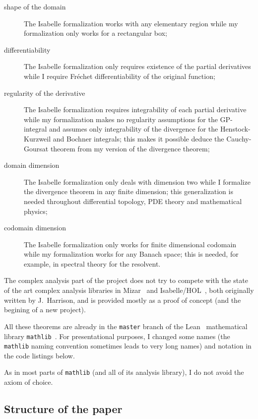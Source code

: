 \documentclass[a4paper, UKenglish,cleveref, autoref, thm-restate]{lipics-v2021}
\begin{document}
\begin{description}
\item[shape of the domain] The Isabelle formalization works with any
  elementary region while my formalization only works for a
  rectangular box;
\item[differentiability] The Isabelle formalization only requires
  existence of the partial derivatives while I require Fréchet
  differentiability of the original function;
\item[regularity of the derivative] The Isabelle formalization
  requires integrability of each partial derivative while my
  formalization makes no regularity assumptions for the GP-integral
  and assumes only integrability of the divergence for the
  Henstock-Kurzweil and Bochner integrals; this makes it possible
  deduce the Cauchy-Goursat theorem from my version of the divergence
  theorem;
\item[domain dimension] The Isabelle formalization only deals with
  dimension two while I formalize the divergence theorem in any finite
  dimension; this generalization is needed throughout differential
  topology, PDE theory and mathematical physics;
\item[codomain dimension] The Isabelle formalization only works for
  finite dimensional codomain while my formalization works for any
  Banach space; this is needed, for example, in spectral theory for
  the resolvent.
\end{description}

The complex analysis part of the project does not try to compete with
the state of the art complex analysis libraries in
Mizar~\cite{harrison-mizar} and Isabelle/HOL~\cite{harrison-hol}, both
originally written by J.~Harrison, and is provided mostly as a proof
of concept (and the begining of a new project).

All these theorems are already in the \texttt{master} branch of the
Lean~\cite{10.1007/978-3-319-21401-6_26} mathematical library
\texttt{mathlib}~\cite{mathlib20}. For presentational purposes, I
changed some names (the \texttt{mathlib} naming convention sometimes
leads to very long names) and notation in the code listings below.

As in most parts of \texttt{mathlib} (and all of its analysis
library), I do not avoid the axiom of choice.

\subsection{Structure of the paper}%
\label{sec:structure-paper}
\end{document}
